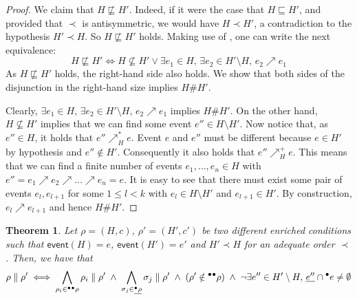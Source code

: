 \documentclass{article}
\newtheorem{theorem}{Theorem}
\newcommand{\event}[1]{\ensuremath{\mathsf{event}(#1)}}
\newcommand{\confl}{\ensuremath{\mathord{\#}}}
\begin{document}
\begin{proof}
We claim that $H \not\sqsubseteq H'$.  Indeed, if it were the case that $H
\sqsubseteq H'$, and provided that $\prec$ is antisymmetric, we would have $H
\prec H'$, a contradiction to the hypothesis $H' \prec H$.  So $H
\not\sqsubseteq H'$ holds.  Making use of , one can
write the next equivalence: $$H \not\sqsubseteq H' \iff H \not\subseteq H' \lor
\exists e_1 \in H,\, \exists e_2 \in H' \setminus H,\, e_2 \nearrow e_1$$  As
$H \not\sqsubseteq H'$ holds, the right-hand side also holds.  We show that
both sides of the disjunction in the right-hand size implies $H \confl H'$.

Clearly, $\exists e_1 \in H,\, \exists e_2 \in H' \setminus H,\, e_2 \nearrow
e_1$ implies $H \confl H'$.  On the other hand, $H \not\subseteq H'$ implies
that we can find some event $e'' \in H \setminus H'$.  Now notice that, as $e''
\in H$, it holds that $e'' \nearrow^*_H e$.  Event $e$ and $e''$ must be
different because $e \in H'$ by hypothesis and $e'' \notin H'$.  Consequently
it also holds that $e'' \nearrow^+_H e$.  This means that we can find a finite
number of events $e_1, \ldots, e_n \in H$ with $e'' = e_1 \nearrow e_2 \nearrow
\ldots \nearrow e_n = e$.  It is easy to see that there must exist some pair of
events $e_l, e_{l+1}$ for some $1 \le l < k$ with $e_l \in H \setminus H'$ and
$e_{l+1} \in H'$.  By construction, $e_l \nearrow e_{l+1}$ and hence $H \confl
H'$.
\end{proof}



\begin{theorem}
Let $\rho = (H, c)$, $\rho' = (H', c')$ be two different enriched conditions
such that $\event{H} = e$, $\event{H'} = e'$ and $H' \prec H$ for an adequate
order $\prec$.  Then, we have that $$\rho \parallel \rho' \iff
\bigwedge_{\rho_i \in {}^\bullet{}^\bullet\rho} \rho_i \parallel \rho' \; \land \;
\bigwedge_{\sigma_j \in \underline{{}^\bullet\rho}} \sigma_j \parallel \rho' \; \land \;
(\rho' \notin {}^\bullet{}^\bullet\rho) \; \land \; \lnot \exists e'' \in H' \setminus
H,\, \underline{e''} \cap {}^\bullet e \not= \emptyset$$
\end{theorem}
\end{document}
